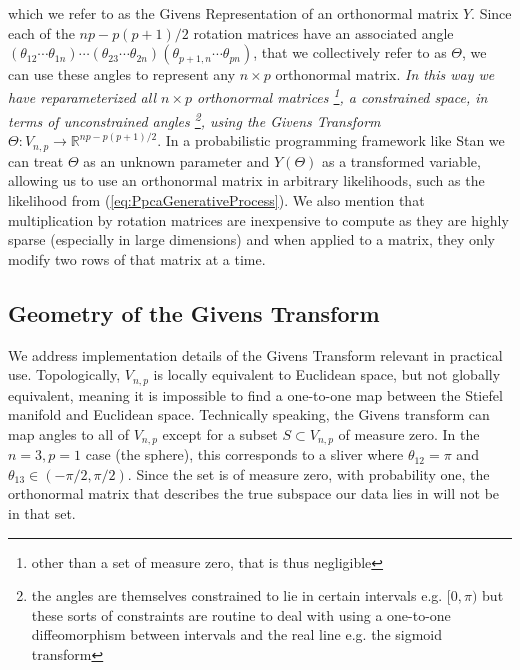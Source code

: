 \documentclass{article}
\begin{document}
which we refer to as the Givens Representation of an orthonormal matrix $Y$. Since each of the $np -p(p+1)/2$ rotation matrices have an associated  angle $(\theta_{12} \cdots \theta_{1n}) \cdots (\theta_{23} \cdots \theta_{2n}) (\theta_{p+1,n} \cdots \theta_{pn})$, that we collectively refer to as $\Theta$, we can use these angles to represent any $n \times p$ orthonormal matrix. \textit{In this way we have reparameterized all $n \times p$ orthonormal matrices \footnote{other than a set of measure zero, that is thus negligible}, a constrained space, in terms of unconstrained angles \footnote{the angles are themselves constrained to lie in certain intervals e.g. $[0, \pi)$ but these sorts of constraints are routine to deal with using a one-to-one diffeomorphism between intervals and the real line e.g. the sigmoid transform}, using the Givens Transform $\Theta: V_{n,p} \to \mathbb{R}^{np -p(p+1)/2}$}. In a probabilistic programming framework like Stan we can treat $\Theta$ as an unknown parameter and $Y(\Theta)$ as a transformed variable, allowing us to use an orthonormal matrix in arbitrary likelihoods, such as the likelihood from (\ref{eq:PpcaGenerativeProcess}). We also mention that multiplication by rotation matrices are inexpensive to compute as they are highly sparse (especially in large dimensions) and when applied to a matrix, they only modify two rows of that matrix at a time.

\subsection{Geometry of the Givens Transform}\label{geomGivens}

We address implementation details of the Givens Transform relevant in practical use. Topologically, $V_{n,p}$ is locally equivalent to Euclidean space, but not globally equivalent, meaning it is impossible to find a one-to-one map between the Stiefel manifold and Euclidean space. Technically speaking, the Givens transform can map angles to all of $V_{n,p}$ except for a subset $S \subset V_{n,p}$ of measure zero.  In the $n=3, p=1$ case (the sphere), this corresponds to a sliver where $\theta_{12} = \pi$ and $\theta_{13} \in (-\pi/2, \pi/2)$. Since the set is of measure zero, with probability one, the orthonormal matrix that describes the true subspace our data lies in will not be in that set. 
\end{document}
